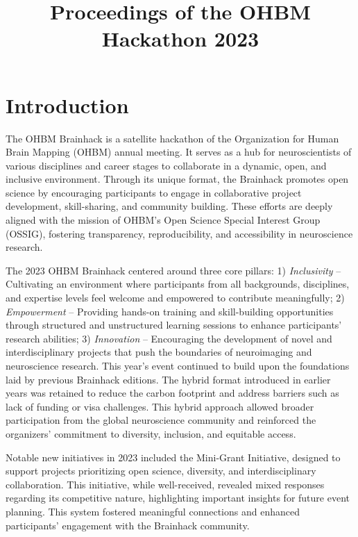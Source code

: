 \documentclass{article}
\title{Proceedings of the OHBM Hackathon 2023}
\begin{document}
\maketitle

\section{Introduction}

The OHBM Brainhack is a satellite hackathon of the Organization for Human Brain Mapping (OHBM) annual meeting.
It serves as a hub for neuroscientists of various disciplines and career stages to collaborate in a dynamic, open, and inclusive environment.
Through its unique format, the Brainhack promotes open science by encouraging participants to engage in collaborative project development, skill-sharing, and community building.
These efforts are deeply aligned with the mission of OHBM’s Open Science Special Interest Group (OSSIG), fostering transparency, reproducibility, and accessibility in neuroscience research.

The 2023 OHBM Brainhack centered around three core pillars:
1) \emph{Inclusivity} – Cultivating an environment where participants from all backgrounds, disciplines, and expertise levels feel welcome and empowered to contribute meaningfully;
2) \emph{Empowerment} – Providing hands-on training and skill-building opportunities through structured and unstructured learning sessions to enhance participants' research abilities;
3) \emph{Innovation} – Encouraging the development of novel and interdisciplinary projects that push the boundaries of neuroimaging and neuroscience research.
This year’s event continued to build upon the foundations laid by previous Brainhack editions.
The hybrid format introduced in earlier years was retained to reduce the carbon footprint \cite{Epp2023} and address barriers such as lack of funding or visa challenges.
This hybrid approach allowed broader participation from the global neuroscience community and reinforced the organizers' commitment to diversity, inclusion, and equitable access.

Notable new initiatives in 2023 included the Mini-Grant Initiative, designed to support projects prioritizing open science, diversity, and interdisciplinary collaboration.
This initiative, while well-received, revealed mixed responses regarding its competitive nature, highlighting important insights for future event planning.
This system fostered meaningful connections and enhanced participants' engagement with the Brainhack community.
\end{document}
